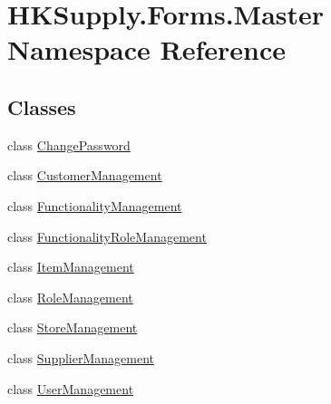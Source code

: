 \hypertarget{namespace_h_k_supply_1_1_forms_1_1_master}{}\section{H\+K\+Supply.\+Forms.\+Master Namespace Reference}
\label{namespace_h_k_supply_1_1_forms_1_1_master}
\subsection*{Classes}
\begin{DoxyCompactItemize}
\item 
class \hyperlink{class_h_k_supply_1_1_forms_1_1_master_1_1_change_password}{Change\+Password}
\item 
class \hyperlink{class_h_k_supply_1_1_forms_1_1_master_1_1_customer_management}{Customer\+Management}
\item 
class \hyperlink{class_h_k_supply_1_1_forms_1_1_master_1_1_functionality_management}{Functionality\+Management}
\item 
class \hyperlink{class_h_k_supply_1_1_forms_1_1_master_1_1_functionality_role_management}{Functionality\+Role\+Management}
\item 
class \hyperlink{class_h_k_supply_1_1_forms_1_1_master_1_1_item_management}{Item\+Management}
\item 
class \hyperlink{class_h_k_supply_1_1_forms_1_1_master_1_1_role_management}{Role\+Management}
\item 
class \hyperlink{class_h_k_supply_1_1_forms_1_1_master_1_1_store_management}{Store\+Management}
\item 
class \hyperlink{class_h_k_supply_1_1_forms_1_1_master_1_1_supplier_management}{Supplier\+Management}
\item 
class \hyperlink{class_h_k_supply_1_1_forms_1_1_master_1_1_user_management}{User\+Management}
\end{DoxyCompactItemize}
